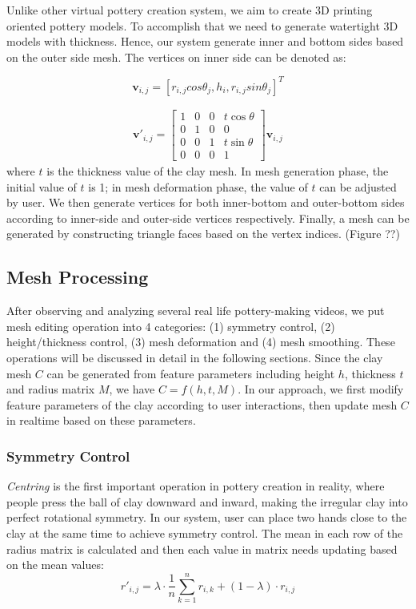 Unlike other virtual pottery creation system, we aim to create 3D printing oriented pottery models. To accomplish that we need to generate watertight 3D models with thickness. Hence, our system generate inner and bottom sides based on the outer side mesh. The vertices on inner side can be denoted as:

\begin{equation}
\mathbf{v}_{i,j} =
\left[r_{i,j}  cos \theta_{j},
h_{i},
r_{i,j} sin \theta_{j}\right]^T
\end{equation}

\begin{equation}
\begin{split}
\mathbf{v'}_{i,j} = 
\begin{bmatrix}
1 & 0 & 0 & t\cos\theta \\
0 & 1 & 0 & 0\\ 
0 & 0 & 1 & t\sin\theta \\
0 & 0 & 0 & 1 
\end{bmatrix}
\mathbf{v}_{i,j}
\end{split}
\end{equation}
where $t$ is the thickness value of the clay mesh. In mesh generation phase, the initial value of $t$ is 1; in mesh deformation phase, the value of $t$ can be adjusted by user.
We then generate vertices for both inner-bottom and outer-bottom sides according to inner-side and outer-side vertices respectively. Finally, a mesh can be generated by constructing triangle faces based on the vertex indices. (Figure ??)



\subsection{Mesh Processing}
\label{sec:4.2}
After observing and analyzing several real life pottery-making videos, we put mesh editing operation into 4 categories: (1) symmetry control, (2) height/thickness control, (3) mesh deformation and (4) mesh smoothing. These operations will be discussed in detail in the following sections.
Since the clay mesh $C$ can be generated from feature parameters including height $h$, thickness $t$ and radius matrix $M$, we have $ C =  f(h, t, M) $.
In our approach, we first modify feature parameters of the clay according to user interactions, then update mesh $C$  in realtime based on these parameters.

\subsubsection{Symmetry Control}
\label{sec:4.2.1}
\textit{Centring} is the first important operation in pottery creation in reality, where people press the ball of clay downward and inward, making the irregular clay into perfect rotational symmetry.
In our system, user can place two hands close to the clay at the same time to achieve symmetry control.
The mean in each row of the radius matrix is calculated and then each value in matrix needs updating based on the mean values:
\begin{equation}
r'_{i,j} = 
\lambda \cdot \frac{1}{n}\sum_{k=1}^{n} r_{i,k}
+ (1 - \lambda) \cdot r_{i,j}
\end{equation}

